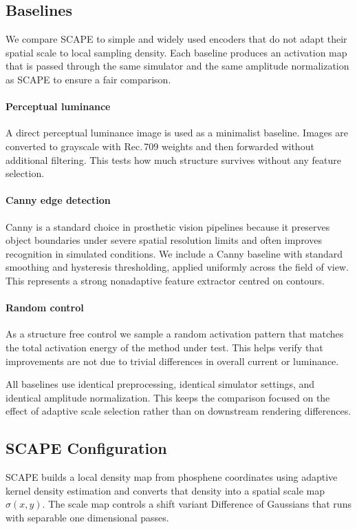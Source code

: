 \subsection{Baselines}
We compare SCAPE to simple and widely used encoders that do not adapt their spatial scale to local sampling density. Each baseline produces an activation map that is passed through the same simulator and the same amplitude normalization as SCAPE to ensure a fair comparison.

\paragraph{Perceptual luminance}
A direct perceptual luminance image is used as a minimalist baseline. Images are converted to grayscale with Rec.\,709 weights and then forwarded without additional filtering. This tests how much structure survives without any feature selection.

\paragraph{Canny edge detection}
Canny is a standard choice in prosthetic vision pipelines because it preserves object boundaries under severe spatial resolution limits and often improves recognition in simulated conditions. We include a Canny baseline with standard smoothing and hysteresis thresholding, applied uniformly across the field of view. This represents a strong nonadaptive feature extractor centred on contours.

\paragraph{Random control}
As a structure free control we sample a random activation pattern that matches the total activation energy of the method under test. This helps verify that improvements are not due to trivial differences in overall current or luminance.

\medskip
All baselines use identical preprocessing, identical simulator settings, and identical amplitude normalization. This keeps the comparison focused on the effect of adaptive scale selection rather than on downstream rendering differences.



\subsection{SCAPE Configuration}
SCAPE builds a local density map from phosphene coordinates using adaptive kernel density estimation and converts that density into a spatial scale map \(\sigma(x,y)\). The scale map controls a shift variant Difference of Gaussians that runs with separable one dimensional passes.


